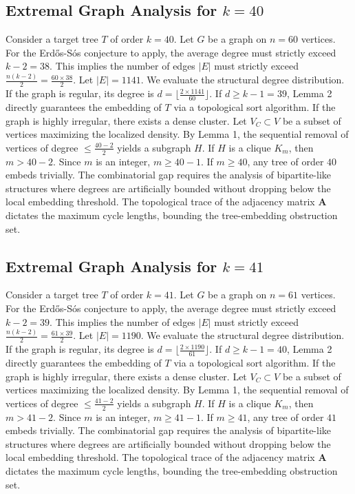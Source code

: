\documentclass[11pt,a4paper]{article}
\begin{document}
\subsection{Extremal Graph Analysis for $k=40$}
Consider a target tree $T$ of order $k=40$.
Let $G$ be a graph on $n=60$ vertices.
For the Erd\H{o}s-S\'os conjecture to apply, the average degree must strictly exceed $k-2 = 38$.
This implies the number of edges $|E|$ must strictly exceed $\frac{n(k-2)}{2} = \frac{60 \times 38}{2}$.
Let $|E| = 1141$.
We evaluate the structural degree distribution. If the graph is regular, its degree is $d = \lfloor \frac{2 \times 1141}{60} \rfloor$.
If $d \geq k-1 = 39$, Lemma 2 directly guarantees the embedding of $T$ via a topological sort algorithm.
If the graph is highly irregular, there exists a dense cluster. Let $V_C \subset V$ be a subset of vertices maximizing the localized density.
By Lemma 1, the sequential removal of vertices of degree $\leq \frac{40-2}{2}$ yields a subgraph $H$.
If $H$ is a clique $K_{m}$, then $m > 40-2$. Since $m$ is an integer, $m \geq 40-1$. If $m \geq 40$, any tree of order $40$ embeds trivially.
The combinatorial gap requires the analysis of bipartite-like structures where degrees are artificially bounded without dropping below the local embedding threshold. The topological trace of the adjacency matrix $\mathbf{A}$ dictates the maximum cycle lengths, bounding the tree-embedding obstruction set.


\subsection{Extremal Graph Analysis for $k=41$}
Consider a target tree $T$ of order $k=41$.
Let $G$ be a graph on $n=61$ vertices.
For the Erd\H{o}s-S\'os conjecture to apply, the average degree must strictly exceed $k-2 = 39$.
This implies the number of edges $|E|$ must strictly exceed $\frac{n(k-2)}{2} = \frac{61 \times 39}{2}$.
Let $|E| = 1190$.
We evaluate the structural degree distribution. If the graph is regular, its degree is $d = \lfloor \frac{2 \times 1190}{61} \rfloor$.
If $d \geq k-1 = 40$, Lemma 2 directly guarantees the embedding of $T$ via a topological sort algorithm.
If the graph is highly irregular, there exists a dense cluster. Let $V_C \subset V$ be a subset of vertices maximizing the localized density.
By Lemma 1, the sequential removal of vertices of degree $\leq \frac{41-2}{2}$ yields a subgraph $H$.
If $H$ is a clique $K_{m}$, then $m > 41-2$. Since $m$ is an integer, $m \geq 41-1$. If $m \geq 41$, any tree of order $41$ embeds trivially.
The combinatorial gap requires the analysis of bipartite-like structures where degrees are artificially bounded without dropping below the local embedding threshold. The topological trace of the adjacency matrix $\mathbf{A}$ dictates the maximum cycle lengths, bounding the tree-embedding obstruction set.
\end{document}

